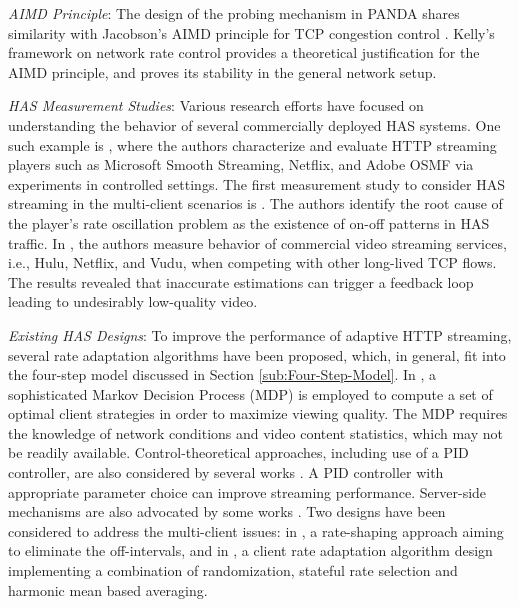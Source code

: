 \documentclass[conference]{IEEEtran}
\theoremstyle{plain}
\theoremstyle{definition}
\theoremstyle{plain}
\theoremstyle{plain}
\begin{document}
\emph{AIMD Principle}: The design of the probing mechanism in PANDA
shares similarity with Jacobson's AIMD principle for TCP congestion
control \cite{Jacobson1988}. Kelly's framework on network rate control
\cite{kelly98} provides a theoretical justification for the AIMD
principle, and proves its stability in the general network setup.

\emph{HAS Measurement Studies}: Various research efforts have focused
on understanding the behavior of several commercially deployed HAS
systems. One such example is \cite{akhashabi12SPIC}, where the authors
characterize and evaluate HTTP streaming players such as Microsoft
Smooth Streaming, Netflix, and Adobe OSMF via experiments in controlled
settings. The first measurement study to consider HAS streaming in
the multi-client scenarios is \cite{Akhshabi:NOSSDAV12}. The authors
identify the root cause of the player's rate oscillation problem as
the existence of on-off patterns in HAS traffic. In \cite{Huang:IMC12},
the authors measure behavior of commercial video streaming services,
i.e., Hulu, Netflix, and Vudu, when competing with other long-lived
TCP flows. The results revealed that inaccurate estimations can trigger
a feedback loop leading to undesirably low-quality video. 

\emph{Existing HAS Designs}: To improve the performance of adaptive
HTTP streaming, several rate adaptation algorithms \cite{Liu:MMSys11,Tian:CoNext12,Zhou:VCIP12,Miller:PV12,Liu:SPIC12}
have been proposed, which, in general, fit into the four-step model
discussed in Section \ref{sub:Four-Step-Model}. In \cite{Jarnikov:SPIC11},
a sophisticated Markov Decision Process (MDP) is employed to compute
a set of optimal client strategies in order to maximize viewing quality.
The MDP requires the knowledge of network conditions and video content
statistics, which may not be readily available. Control-theoretical
approaches, including use of a PID controller, are also considered
by several works \cite{DeCicco:MMSys11,Tian:CoNext12,Zhou:VCIP12}.
A PID controller with appropriate parameter choice can improve streaming
performance. Server-side mechanisms are also advocated by some works
\cite{Houdaille:MMsys12,Akhshabi:NOSSDAV13}. Two designs have been
considered to address the multi-client issues: in \cite{Akhshabi:NOSSDAV13},
a rate-shaping approach aiming to eliminate the off-intervals, and
in \cite{Jiang:CoNext12}, a client rate adaptation algorithm design
implementing a combination of randomization, stateful rate selection
and harmonic mean based averaging.
\end{document}
